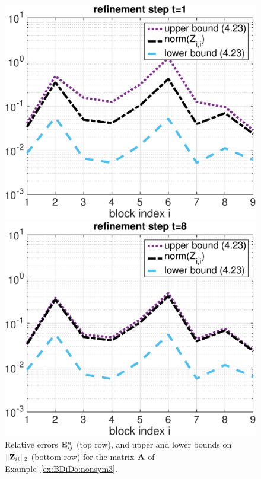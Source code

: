 \begin{example}
{\begin{figure}[h!]
\begin{minipage}[t]{0.48\linewidth}
\includegraphics[width=0.99\linewidth]{figures/9times9_Z4_Bounds_t1.eps}
\end{minipage}
%
\begin{minipage}[t]{0.48\linewidth}
\includegraphics[width=0.99\linewidth]{figures/9times9_Z4_Bounds_t8.eps}
\end{minipage}
\caption{Relative errors $\mathbf{E}^{\text{u}}_{ij}$ (top row), and upper and lower bounds on $\|\mathbf{Z}_{ii}\|_2$ (bottom row) for the matrix $\mathbf{A}$ of Example~\ref{ex:BDiDo:nonsym3}.}
\label{fig:BDiDo:ex:nonsym3}
\end{figure}
}\end{example}

